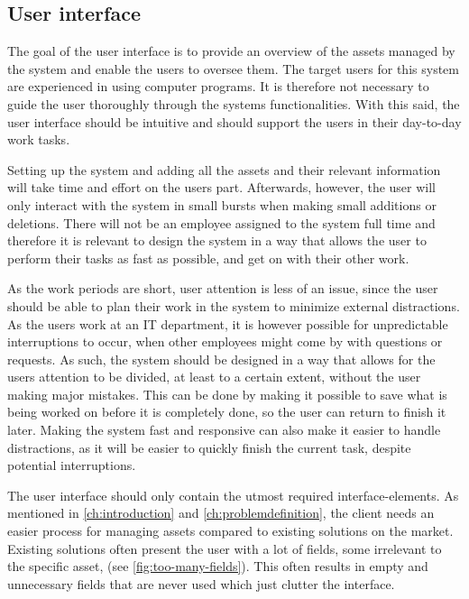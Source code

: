 \subsection{User interface}\label{ssc:UIAnalysis}
The goal of the user interface is to provide an overview of the assets managed by the system and enable the users to oversee them. The target users for this system are experienced in using computer programs. It is therefore not necessary to guide the user thoroughly through the systems functionalities. With this said, the user interface should be intuitive and should support the users in their day-to-day work tasks.
\par

Setting up the system and adding all the assets and their relevant information will take time and effort on the users part. Afterwards, however, the user will only interact with the system in small bursts when making small additions or deletions. There will not be an employee assigned to the system full time and therefore it is relevant to design the system in a way that allows the user to perform their tasks as fast as possible, and get on with their other work.
\par
As the work periods are short, user attention is less of an issue, since the user should be able to plan their work in the system to minimize external distractions. As the users work at an IT department, it is however possible for unpredictable interruptions to occur, when other employees might come by with questions or requests. As such, the system should be designed in a way that allows for the users attention to be divided, at least to a certain extent, without the user making major mistakes. This can be done by making it possible to save what is being worked on before it is completely done, so the user can return to finish it later. Making the system fast and responsive can also make it easier to handle distractions, as it will be easier to quickly finish the current task, despite potential interruptions.
\par

The user interface should only contain the utmost required interface-elements. As mentioned in \autoref{ch:introduction} and \autoref{ch:problemdefinition}, the client needs an easier process for managing assets compared to existing solutions on the market. Existing solutions often present the user with a lot of fields, some irrelevant to the specific asset, (see \autoref{fig:too-many-fields}). This often results in empty and unnecessary fields that are never used which just clutter the interface.

